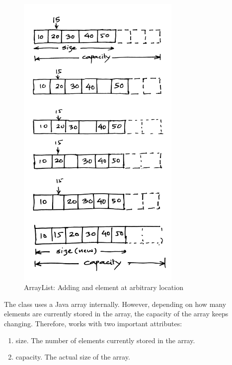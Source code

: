 \documentclass[12pt,a4paper]{article}
\begin{document}
\begin{figure}
	\begin{center}
\includegraphics[width=0.7\textwidth]{array-add.jpg}
	\end{center}
	
	\label{f:aladd}
	\caption{ArrayList: Adding and element at arbitrary location}
\end{figure}

The \lstinline@ArrayList@ class uses a Java array internally. However, depending on how many elements are currently stored in the array, the capacity of the array keeps changing. Therefore, \lstinline@ArrayList@ works with two important attributes:
\begin{enumerate}
	\item size. The number of elements currently stored in the array.
	\item capacity. The actual size of the array.
\end{enumerate}
\end{document}
